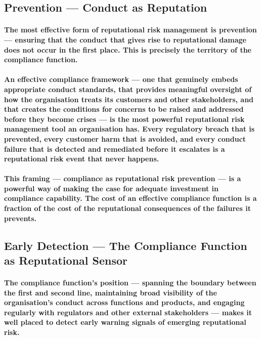 \subsection{Prevention — Conduct as Reputation}
\paragraph{The most effective form of reputational risk management is prevention — ensuring that the conduct that gives rise to reputational damage does not occur in the first place. This is precisely the territory of the compliance function.}
\paragraph{An effective compliance framework — one that genuinely embeds appropriate conduct standards, that provides meaningful oversight of how the organisation treats its customers and other stakeholders, and that creates the conditions for concerns to be raised and addressed before they become crises — is the most powerful reputational risk management tool an organisation has. Every regulatory breach that is prevented, every customer harm that is avoided, and every conduct failure that is detected and remediated before it escalates is a reputational risk event that never happens.}
\paragraph{This framing — compliance as reputational risk prevention — is a powerful way of making the case for adequate investment in compliance capability. The cost of an effective compliance function is a fraction of the cost of the reputational consequences of the failures it prevents.}

\subsection{Early Detection — The Compliance Function as Reputational Sensor}
\paragraph{The compliance function's position — spanning the boundary between the first and second line, maintaining broad visibility of the organisation's conduct across functions and products, and engaging regularly with regulators and other external stakeholders — makes it well placed to detect early warning signals of emerging reputational risk.}
